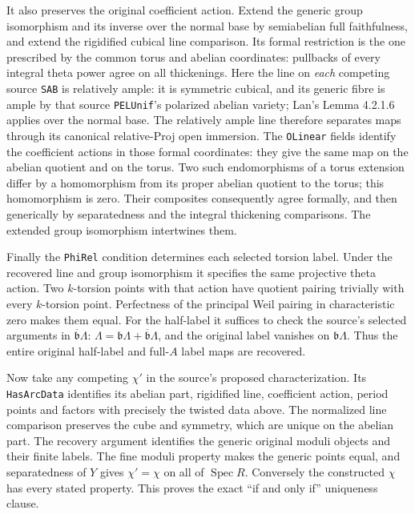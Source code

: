 It also preserves the original coefficient action.  Extend
the generic group isomorphism and its inverse over the normal
base by semiabelian full faithfulness, and extend the
rigidified cubical line comparison.  Its formal restriction
is the one prescribed by the common torus and abelian
coordinates: pullbacks of every integral theta power agree
on all thickenings.  Here the line on \emph{each} competing
source \texttt{SAB} is relatively ample: it is symmetric
cubical, and its generic fibre is ample by that source
\texttt{PELUnif}'s polarized abelian variety; Lan's
Lemma 4.2.1.6 applies over the normal base.
The relatively ample line therefore
separates maps through its canonical relative-Proj open
immersion\cite[Lemma 4.2.1.6 and Propositions 3.3.1.5,
3.3.2.2]{formal-arcs-lan}\cite{formal-arcs-relative-proj}.
The \texttt{OLinear} fields identify the
coefficient actions in those formal coordinates: they give the
same map on the abelian quotient and on the torus.  Two such
endomorphisms of a torus extension differ by a homomorphism
from its proper abelian quotient to the torus; this homomorphism
is zero.  Their
composites consequently agree formally, and then generically
by separatedness and the integral thickening comparisons.
The extended group isomorphism intertwines them.

Finally the \texttt{PhiRel} condition determines each selected
torsion label.  Under the recovered line and group
isomorphism it specifies the same projective theta action.
Two $k$-torsion points with that action have quotient pairing
trivially with every $k$-torsion point.  Perfectness of the
principal Weil pairing in characteristic zero makes them
equal.  For the half-label it suffices to check the source's
selected arguments in $\overline{\mathfrak b}\Lambda$:
$\Lambda=\mathfrak b\Lambda+
\overline{\mathfrak b}\Lambda$, and the original label
vanishes on $\mathfrak b\Lambda$.  Thus the entire original
half-label and full-$A$ label maps are recovered.

Now take any competing $\chi'$ in the source's proposed
characterization.  Its \texttt{HasArcData} identifies its
abelian part, rigidified line, coefficient action, period
points and factors with precisely the twisted data above.
The normalized line comparison preserves the cube and
symmetry, which are unique on the abelian part.
The recovery argument identifies the generic original
moduli objects and their finite labels.  The fine moduli
property makes the generic points equal, and separatedness
of $Y$ gives $\chi'=\chi$ on all of $\operatorname{Spec}R$.
Conversely the constructed $\chi$ has every stated property.
This proves the exact ``if and only if'' uniqueness clause.

